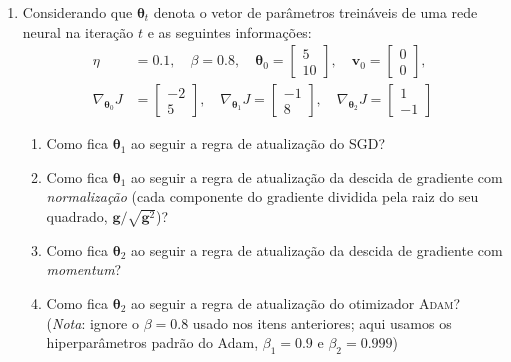 \documentclass{dlproblemset}
\begin{document}
\begin{enumerate}[1)]
    \item Considerando que $\boldsymbol{\theta}_t$ denota o vetor de parâmetros treináveis de uma rede neural na iteração $t$ e as seguintes informações:
    \begin{align*}
    \eta &= 0.1,\quad \beta=0.8, \quad \boldsymbol{\theta}_{0} =
      \begin{bmatrix}
        5 \\
        10
      \end{bmatrix},
      \quad \mathbf{v}_{0} =
      \begin{bmatrix}
        0 \\
        0
      \end{bmatrix},
    \\
    \nabla_{\boldsymbol{\theta}_{0}} J &=
      \begin{bmatrix}
        -2 \\
        5
      \end{bmatrix},
      \quad
      \nabla_{\boldsymbol{\theta}_{1}} J =
      \begin{bmatrix}
        -1 \\
        8
      \end{bmatrix},
      \quad
      \nabla_{\boldsymbol{\theta}_{2}} J =
      \begin{bmatrix}
        1 \\
        -1
      \end{bmatrix}
    \end{align*}
    \begin{enumerate}
        \item Como fica $\boldsymbol{\theta}_{1}$ ao seguir a regra de atualização do SGD?
        \item Como fica $\boldsymbol{\theta}_{1}$ ao seguir a regra de atualização da descida de gradiente com \textit{normalização} (cada componente do gradiente dividida pela raiz do seu quadrado, $\mathbf{g}/\sqrt{\mathbf{g}^{2}}$)?
        \item Como fica $\boldsymbol{\theta}_{2}$ ao seguir a regra de atualização da descida de gradiente com \textit{momentum}?
        \item {} Como fica $\boldsymbol{\theta}_{2}$ ao seguir a regra de atualização do otimizador \textsc{Adam}? (\textit{Nota}: ignore o $\beta = 0.8$ usado nos itens anteriores; aqui usamos os hiperparâmetros padrão do Adam, $\beta_1 = 0.9$ e $\beta_2 = 0.999$)
    \end{enumerate}


\end{enumerate}
\end{document}
